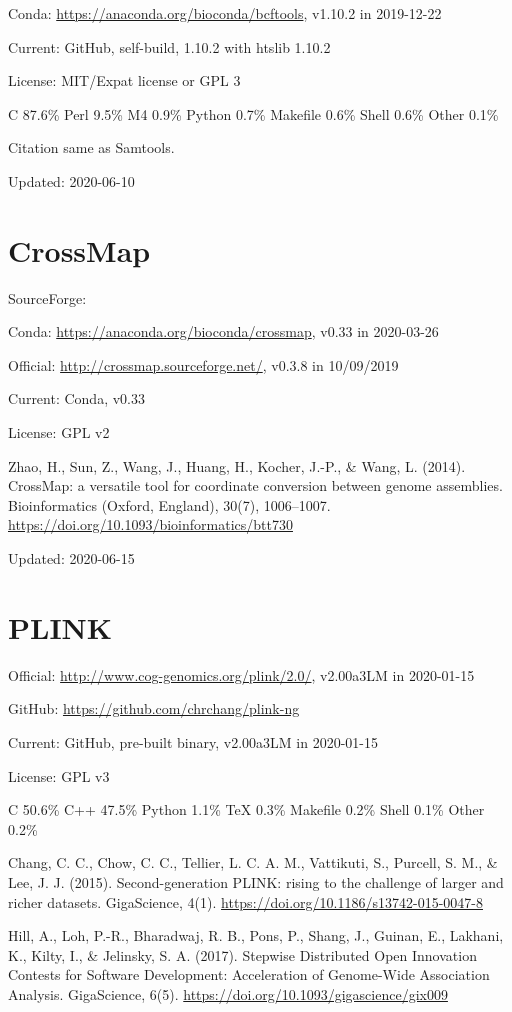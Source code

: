 \documentclass[]{article}
\begin{document}
Conda: \url{https://anaconda.org/bioconda/bcftools}, v1.10.2 in 2019-12-22

Current: GitHub, self-build, 1.10.2 with htslib 1.10.2

License: MIT/Expat license or GPL 3

C 87.6\% Perl 9.5\% M4 0.9\% Python 0.7\% Makefile 0.6\% Shell 0.6\% Other 0.1\%

Citation same as Samtools.

Updated: 2020-06-10

\section{CrossMap}

SourceForge: 

Conda: \url{https://anaconda.org/bioconda/crossmap}, v0.33 in 2020-03-26

Official: \url{http://crossmap.sourceforge.net/}, v0.3.8 in 10/09/2019

Current: Conda, v0.33

License: GPL v2

Zhao, H., Sun, Z., Wang, J., Huang, H., Kocher, J.-P., \& Wang, L. (2014). CrossMap: a versatile tool for coordinate conversion between genome assemblies. Bioinformatics (Oxford, England), 30(7), 1006–1007. \url{https://doi.org/10.1093/bioinformatics/btt730}

Updated: 2020-06-15

\section{PLINK}

Official: \url{http://www.cog-genomics.org/plink/2.0/}, v2.00a3LM in 2020-01-15

GitHub: \url{https://github.com/chrchang/plink-ng}

Current: GitHub, pre-built binary, v2.00a3LM in 2020-01-15

License: GPL v3

C 50.6\% C++ 47.5\% Python 1.1\% TeX 0.3\% Makefile 0.2\% Shell 0.1\% Other 0.2\% 

Chang, C. C., Chow, C. C., Tellier, L. C. A. M., Vattikuti, S., Purcell, S. M., \& Lee, J. J. (2015). Second-generation PLINK: rising to the challenge of larger and richer datasets. GigaScience, 4(1). \url{https://doi.org/10.1186/s13742-015-0047-8}

Hill, A., Loh, P.-R., Bharadwaj, R. B., Pons, P., Shang, J., Guinan, E., Lakhani, K., Kilty, I., \& Jelinsky, S. A. (2017). Stepwise Distributed Open Innovation Contests for Software Development: Acceleration of Genome-Wide Association Analysis. GigaScience, 6(5). \url{https://doi.org/10.1093/gigascience/gix009}
\end{document}
